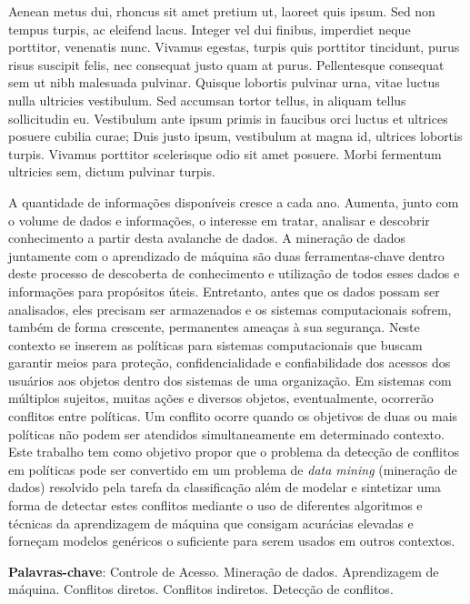 Aenean metus dui, rhoncus sit amet pretium ut, laoreet quis ipsum. Sed non tempus turpis, ac eleifend lacus. Integer vel dui finibus, imperdiet neque porttitor, venenatis nunc. Vivamus egestas, turpis quis porttitor tincidunt, purus risus suscipit felis, nec consequat justo quam at purus. Pellentesque consequat sem ut nibh malesuada pulvinar. Quisque lobortis pulvinar urna, vitae luctus nulla ultricies vestibulum. Sed accumsan tortor tellus, in aliquam tellus sollicitudin eu. Vestibulum ante ipsum primis in faucibus orci luctus et ultrices posuere cubilia curae; Duis justo ipsum, vestibulum at magna id, ultrices lobortis turpis. Vivamus porttitor scelerisque odio sit amet posuere. Morbi fermentum ultricies sem, dictum pulvinar turpis. 

\begin{resumo}


A quantidade de informações disponíveis cresce a cada ano. Aumenta, junto com o volume de dados e informações, o interesse em tratar, analisar e descobrir conhecimento a partir desta avalanche de dados. A mineração de dados juntamente com o aprendizado de máquina são duas ferramentas-chave dentro deste processo de descoberta de conhecimento e utilização de todos esses dados e informações para propósitos úteis. Entretanto, antes que os dados possam ser analisados, eles precisam ser armazenados e os sistemas computacionais sofrem, também de forma crescente, permanentes ameaças à sua segurança. Neste contexto se inserem as políticas para sistemas computacionais que buscam garantir meios para proteção, confidencialidade e confiabilidade dos acessos dos usuários aos objetos dentro dos sistemas de uma organização. Em sistemas com múltiplos sujeitos, muitas ações e diversos objetos, eventualmente, ocorrerão conflitos entre políticas. Um conflito ocorre quando os objetivos de duas ou mais políticas não podem ser atendidos simultaneamente em determinado contexto. Este trabalho tem como objetivo propor que o problema da detecção de conflitos em políticas pode ser convertido em um problema de \textit{data mining} (mineração de dados) resolvido pela tarefa da classificação além de modelar e sintetizar uma forma de detectar estes conflitos mediante o uso de diferentes algoritmos e técnicas da aprendizagem de máquina que consigam acurácias elevadas e forneçam modelos genéricos o suficiente para serem usados em outros contextos.

{\hspace{-8mm} \bf{Palavras-chave}}: Controle de Acesso. Mineração de dados. Aprendizagem de máquina. Conflitos diretos. Conflitos indiretos. Detecção de conflitos.

\end{resumo}

